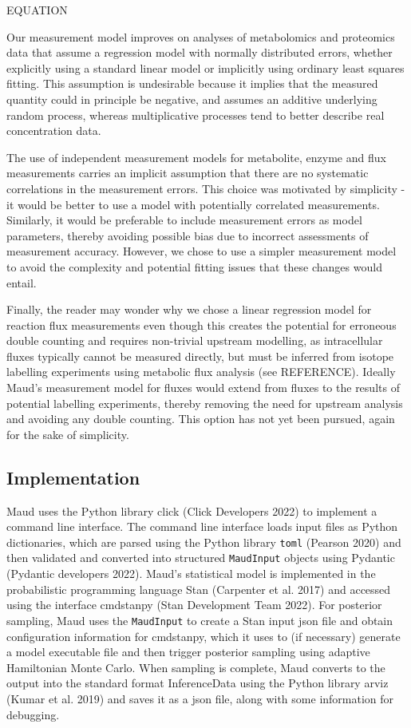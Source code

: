 \documentclass[
  letterpaper,
  DIV=11,
  numbers=noendperiod]{scrartcl}
\begin{document}
EQUATION

Our measurement model improves on analyses of metabolomics and
proteomics data that assume a regression model with normally distributed
errors, whether explicitly using a standard linear model or implicitly
using ordinary least squares fitting. This assumption is undesirable
because it implies that the measured quantity could in principle be
negative, and assumes an additive underlying random process, whereas
multiplicative processes tend to better describe real concentration
data.

The use of independent measurement models for metabolite, enzyme and
flux measurements carries an implicit assumption that there are no
systematic correlations in the measurement errors. This choice was
motivated by simplicity - it would be better to use a model with
potentially correlated measurements. Similarly, it would be preferable
to include measurement errors as model parameters, thereby avoiding
possible bias due to incorrect assessments of measurement accuracy.
However, we chose to use a simpler measurement model to avoid the
complexity and potential fitting issues that these changes would entail.

Finally, the reader may wonder why we chose a linear regression model
for reaction flux measurements even though this creates the potential
for erroneous double counting and requires non-trivial upstream
modelling, as intracellular fluxes typically cannot be measured
directly, but must be inferred from isotope labelling experiments using
metabolic flux analysis (see REFERENCE). Ideally Maud's measurement
model for fluxes would extend from fluxes to the results of potential
labelling experiments, thereby removing the need for upstream analysis
and avoiding any double counting. This option has not yet been pursued,
again for the sake of simplicity.

\hypertarget{implementation}{%
\subsection{Implementation}\label{implementation}}

Maud uses the Python library click (Click Developers 2022) to implement
a command line interface. The command line interface loads input files
as Python dictionaries, which are parsed using the Python library
\texttt{toml} (Pearson 2020) and then validated and converted into
structured \texttt{MaudInput} objects using Pydantic (Pydantic
developers 2022). Maud's statistical model is implemented in the
probabilistic programming language Stan (Carpenter et al. 2017) and
accessed using the interface cmdstanpy (Stan Development Team 2022). For
posterior sampling, Maud uses the \texttt{MaudInput} to create a Stan
input json file and obtain configuration information for cmdstanpy,
which it uses to (if necessary) generate a model executable file and
then trigger posterior sampling using adaptive Hamiltonian Monte Carlo.
When sampling is complete, Maud converts to the output into the standard
format InferenceData using the Python library arviz (Kumar et al. 2019)
and saves it as a json file, along with some information for debugging.
\end{document}
